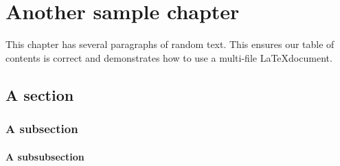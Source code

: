 
\chapter{Another sample chapter}\label{chap:ipsum}

This chapter has several paragraphs of random text. 
This ensures our table of contents is correct and demonstrates how to use a multi-file \LaTeX document.

\lipsum[1]

\section{A section}
\lipsum[10]

\subsection{A subsection}
\lipsum[9]

\subsubsection{A subsubsection}
\lipsum[11]


